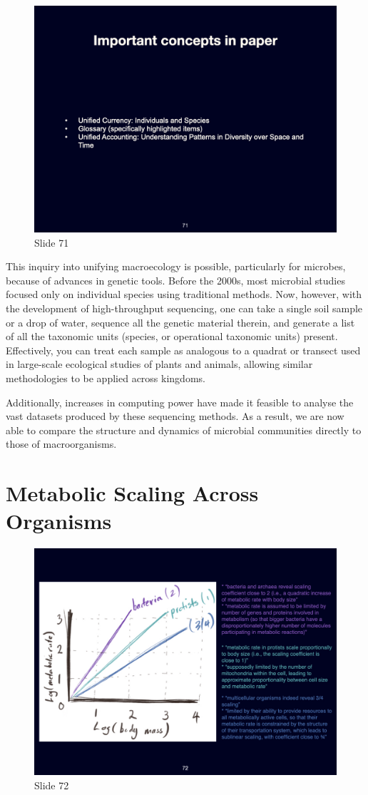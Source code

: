 \documentclass[
  12pt,
]{book}
\begin{document}
\begin{figure}[ht]
\centering
\includegraphics[width=0.8\linewidth]{../images/BDC334/BDC334-071.jpeg}
\caption*{Slide 71}
\end{figure}

This inquiry into unifying macroecology is possible, particularly for
microbes, because of advances in genetic tools. Before the 2000s, most
microbial studies focused only on individual species using traditional
methods. Now, however, with the development of high-throughput
sequencing, one can take a single soil sample or a drop of water,
sequence all the genetic material therein, and generate a list of all
the taxonomic units (species, or operational taxonomic units) present.
Effectively, you can treat each sample as analogous to a quadrat or
transect used in large-scale ecological studies of plants and animals,
allowing similar methodologies to be applied across kingdoms.

Additionally, increases in computing power have made it feasible to
analyse the vast datasets produced by these sequencing methods. As a
result, we are now able to compare the structure and dynamics of
microbial communities directly to those of macroorganisms.

\section{Metabolic Scaling Across
Organisms}\label{metabolic-scaling-across-organisms}

\begin{figure}[ht]
\centering
\includegraphics[width=0.8\linewidth]{../images/BDC334/BDC334-072.jpeg}
\caption*{Slide 72}
\end{figure}
\end{document}
